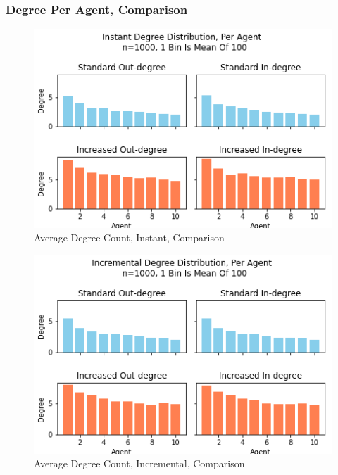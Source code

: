 \documentclass{article}
\begin{document}
\subsubsection{Degree Per Agent, Comparison}
\begin{center}
    \begin{figure}[!htbp]
        \centering
        \includegraphics[width=.8\textwidth]{ThesisKI/Images/ComparisonPerAgentInstant.png}
        \caption{Average Degree Count, Instant, Comparison}
        \label{DPA:InsCom}
    \end{figure}
\end{center}
\begin{center}
    \begin{figure}[!htbp]
        \centering
        \includegraphics[width=.8\textwidth]{ThesisKI/Images/ComparisonPerAgentIncremental.png}
        \caption{Average Degree Count, Incremental, Comparison}
        \label{DPA:IncCom}
    \end{figure}
\end{center}
\end{document}
